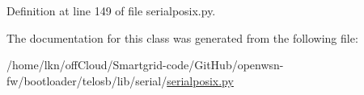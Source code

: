 Definition at line 149 of file serialposix.\+py.



The documentation for this class was generated from the following file\+:\begin{DoxyCompactItemize}
\item 
/home/lkn/off\+Cloud/\+Smartgrid-\/code/\+Git\+Hub/openwsn-\/fw/bootloader/telosb/lib/serial/\hyperlink{serialposix_8py}{serialposix.\+py}\end{DoxyCompactItemize}
